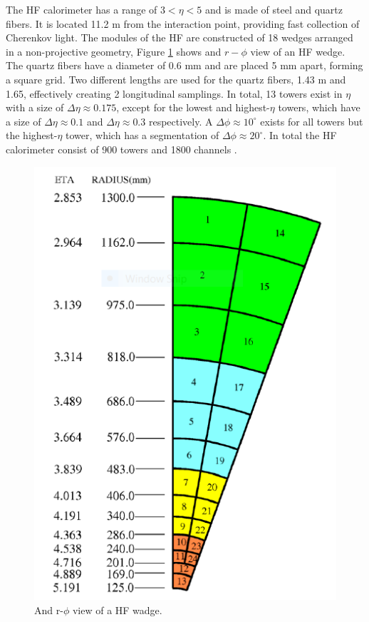 The HF calorimeter has a range of $3<\eta<5$ and is made of steel and quartz fibers. It is located 11.2 m from the interaction point, providing fast collection of Cherenkov light. The modules of the HF are constructed of 18 wedges arranged in a non-projective geometry, Figure \ref{wedge} shows and $r-\phi$ view of an HF wedge. The quartz fibers have a diameter of 0.6 mm and are placed 5 mm apart, forming a square grid. Two different lengths are used for the quartz fibers, 1.43 m and 1.65, effectively creating 2 longitudinal samplings. In total, 13 towers exist in $\eta$ with a size of $\Delta\eta\approx 0.175$, except for the lowest and highest-$\eta$ towers, which have a size of $\Delta\eta\approx 0.1$ and $\Delta\eta\approx 0.3$ respectively. A $\Delta\phi\approx 10^{\circ}$ exists for all towers but the highest-$\eta$ tower, which has a segmentation of $\Delta\phi\approx 20^{\circ}$. In total the HF calorimeter consist of 900 towers and 1800 channels \cite{cms-manual}.
\begin{center}
    
\begin{figure}
    \centering
    \includegraphics[scale=0.5]{Chapter2/hfes.PNG}
    \caption[Hadron forward wadge.]{And r-$\phi$ view of a HF wadge.}
    \label{wedge}
\end{figure}
\end{center}
